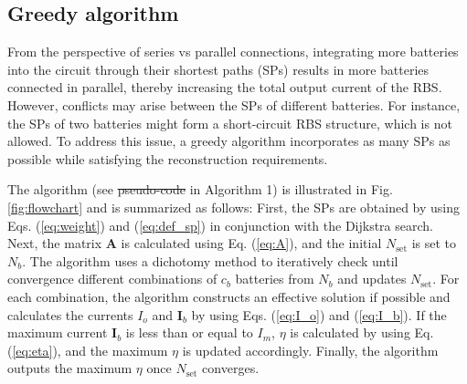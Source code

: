 \documentclass{article}
\providecommand{\DIFadd}[1]{{\protect\color{blue}\uwave{#1}}} %
\providecommand{\DIFdel}[1]{{\protect\color{red}\sout{#1}}}                      %
\providecommand{\DIFaddbegin}{} %
\providecommand{\DIFaddend}{} %
\providecommand{\DIFdelbegin}{} %
\providecommand{\DIFdelend}{} %
\newcommand{\DIFscaledelfig}{0.5}
\newlength{\DIFdelgraphicswidth} %
\newlength{\DIFdelgraphicsheight} %
\newcommand{\DIFaddincludegraphics}[2][]{{\color{blue}\fbox{\DIFOincludegraphics[#1]{#2}}}} %
\newcommand{\DIFdelincludegraphics}[2][]{%
\sbox{\DIFdelgraphicsbox}{\DIFOincludegraphics[#1]{#2}}%
\settoboxwidth{\DIFdelgraphicswidth}{\DIFdelgraphicsbox} %
\settoboxtotalheight{\DIFdelgraphicsheight}{\DIFdelgraphicsbox} %
\scalebox{\DIFscaledelfig}{%
\parbox[b]{\DIFdelgraphicswidth}{\usebox{\DIFdelgraphicsbox}\\[-\baselineskip] \rule{\DIFdelgraphicswidth}{0em}}\llap{\resizebox{\DIFdelgraphicswidth}{\DIFdelgraphicsheight}{%
\setlength{\unitlength}{\DIFdelgraphicswidth}%
\begin{picture}(1,1)%
\thicklines\linethickness{2pt} %
{\color[rgb]{1,0,0}\put(0,0){\framebox(1,1){}}}%
{\color[rgb]{1,0,0}\put(0,0){\line( 1,1){1}}}%
{\color[rgb]{1,0,0}\put(0,1){\line(1,-1){1}}}%
\end{picture}%
}\hspace*{3pt}}} %
} %
\DeclareRobustCommand{\DIFaddbegin}{\DIFOaddbegin \let\includegraphics\DIFaddincludegraphics} %
\DeclareRobustCommand{\DIFaddend}{\DIFOaddend \let\includegraphics\DIFOincludegraphics} %
\DeclareRobustCommand{\DIFdelbegin}{\DIFOdelbegin \let\includegraphics\DIFdelincludegraphics} %
\DeclareRobustCommand{\DIFdelend}{\DIFOaddend \let\includegraphics\DIFOincludegraphics} %
\begin{document}
\subsection{Greedy algorithm}\label{subsec:greedy_solution}

From the perspective of series vs parallel connections, integrating more batteries into the circuit through their shortest paths (SPs) results in more batteries connected in parallel, thereby increasing the total output current of the RBS.
However, conflicts may arise between the SPs of different batteries. 
For instance, the SPs of two batteries might form a short-circuit RBS structure, which is not allowed. 
To address this issue, a greedy algorithm incorporates as many SPs as possible while satisfying the reconstruction requirements.

The algorithm (see \DIFdelbegin \DIFdel{pseudo-code }\DIFdelend \DIFaddbegin \DIFadd{pseudocode }\DIFaddend in Algorithm 1) is illustrated in Fig. \ref{fig:flowchart} and is summarized as follows:
First, the SPs are obtained by using Eqs. (\ref{eq:weight}) and (\ref{eq:def_sp}) in conjunction with the Dijkstra search. 
Next, the matrix $\bm{A}$ is calculated using Eq. (\ref{eq:A}), and the initial $N_{\text{set}}$ is set to $N_b$. 
The algorithm uses a dichotomy method to iteratively check until convergence different combinations of $c_b$ batteries from $N_b$ and updates $N_{\text{set}}$. 
For each combination, the algorithm constructs an effective solution if possible and calculates the currents $I_o$ and $\bm{I}_b$ by using Eqs. (\ref{eq:I_o}) and (\ref{eq:I_b}). 
If the maximum current $\bm{I}_b$ is less than or equal to $I_m$, $\eta$ is calculated by using Eq. (\ref{eq:eta}), and the maximum $\eta$ is updated accordingly. 
Finally, the algorithm outputs the maximum $\eta$ once $N_{\text{set}}$ converges.
\end{document}
